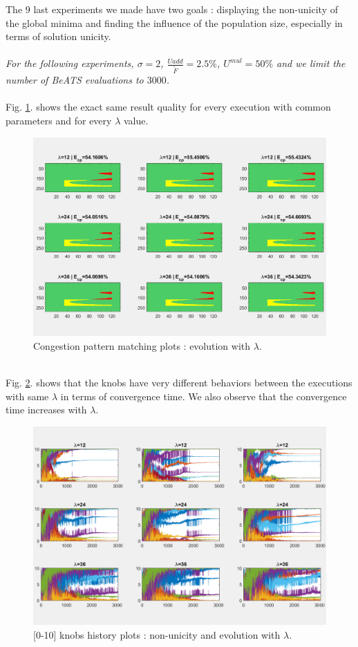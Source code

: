 The $9$ last experiments we made have two goals : displaying the non-unicity of the global minima and finding the influence of the population size, especially in terms of solution unicity.\\
\\
\emph{For the following experiments, $\sigma=2$, $\frac{U{add}}{\widetilde{F}}=2.5\% $, $U^{mul}=50\% $ and we limit the number of BeATS evaluations to $3000$.} \\
\\
Fig. \ref{fig:lambdacp}. shows the exact same result quality for every execution with common parameters and for every $\lambda$ value.\\
\begin{figure}[!h]
	\caption{Congestion pattern matching plots : evolution with $\lambda$.}
	\label{fig:lambdacp}
	\includegraphics[width=7in]{figures/results_figures/lambda/cp_lambda_all.png}
\end{figure}
\\
Fig. \ref{fig:lambdaknobs}. shows that the knobs have very different behaviors between the executions with same $\lambda$ in terms of convergence time. We also observe that the convergence time increases with $\lambda$.\\
\begin{figure}[!h]
	\caption{[0-10] knobs history plots : non-unicity and evolution with $\lambda$.}
	\label{fig:lambdaknobs}
	\includegraphics[width=7in]{figures/results_figures/lambda/knobs_lambda_all.png}
\end{figure}
